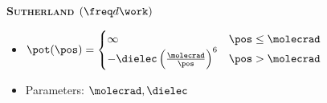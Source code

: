 \begin{mdframed}
    
    {\bfseries\textsc{Sutherland} $(\freq d\work)$}
	\begin{itemize}[label=]
	\item $\pot(\pos)=\begin{cases}
                    \infty & \pos \leq \molecrad\\
                    -\dielec\left(\frac{\molecrad}{\pos}\right)^6& \pos > \molecrad
                \end{cases}$
	\item Parameters: $\molecrad, \dielec$   
\end{itemize}
   
\end{mdframed}